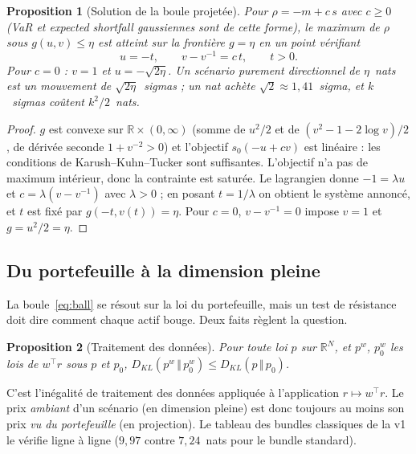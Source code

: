 \documentclass[11pt]{article}
\newtheorem{proposition}{Proposition}
\theoremstyle{definition}
\theoremstyle{remark}
\newcommand{\KL}[2]{D_{KL}\!\left(#1\,\Vert\,#2\right)}
\begin{document}
\begin{proposition}[Solution de la boule projetée]
\label{prop:ballsol}
Pour $\rho=-m+c\,s$ avec $c\ge0$ (VaR et expected shortfall gaussiennes sont de
cette forme), le maximum de $\rho$ sous $g(u,v)\le\eta$ est atteint sur la
frontière $g=\eta$ en un point vérifiant
\begin{equation*}
u=-t,\qquad v-v^{-1}=c\,t,\qquad t>0 .
\end{equation*}
Pour $c=0$ : $v=1$ et $u=-\sqrt{2\eta}$. \emph{Un scénario purement
directionnel de $\eta$~nats est un mouvement de $\sqrt{2\eta}$~sigmas} ; un
nat achète $\sqrt2\approx1{,}41$~sigma, et $k$~sigmas coûtent $k^2/2$~nats.
\end{proposition}

\begin{proof}
$g$ est convexe sur $\mathbb R\times(0,\infty)$ (somme de $u^2/2$ et de
$(v^2-1-2\log v)/2$, de dérivée seconde $1+v^{-2}>0$) et l'objectif
$s_0(-u+cv)$ est linéaire : les conditions de Karush--Kuhn--Tucker sont
suffisantes. L'objectif n'a pas de maximum intérieur, donc la contrainte est
saturée. Le lagrangien donne $-1=\lambda u$ et $c=\lambda(v-v^{-1})$ avec
$\lambda>0$ ; en posant $t=1/\lambda$ on obtient le système annoncé, et $t$ est
fixé par $g(-t,v(t))=\eta$. Pour $c=0$, $v-v^{-1}=0$ impose $v=1$ et
$g=u^2/2=\eta$.
\end{proof}

\subsection{Du portefeuille à la dimension pleine}

La boule~\eqref{eq:ball} se résout sur la loi du portefeuille, mais un test de
résistance doit dire comment chaque actif bouge. Deux faits règlent la
question.

\begin{proposition}[Traitement des données]
\label{prop:dpi}
Pour toute loi $p$ sur $\mathbb R^N$, et $p^w$, $p_0^w$ les lois de $w^\top r$
sous $p$ et $p_0$,
$\KL{p^w}{p_0^w}\le\KL{p}{p_0}$.
\end{proposition}

C'est l'inégalité de traitement des données \citep{cover2006} appliquée à
l'application $r\mapsto w^\top r$. Le prix \emph{ambiant} d'un scénario (en
dimension pleine) est donc toujours au moins son prix \emph{vu du portefeuille}
(en projection). Le tableau des bundles classiques de la v1 le vérifie ligne à
ligne ($9{,}97$ contre $7{,}24$~nats pour le bundle standard).
\end{document}
